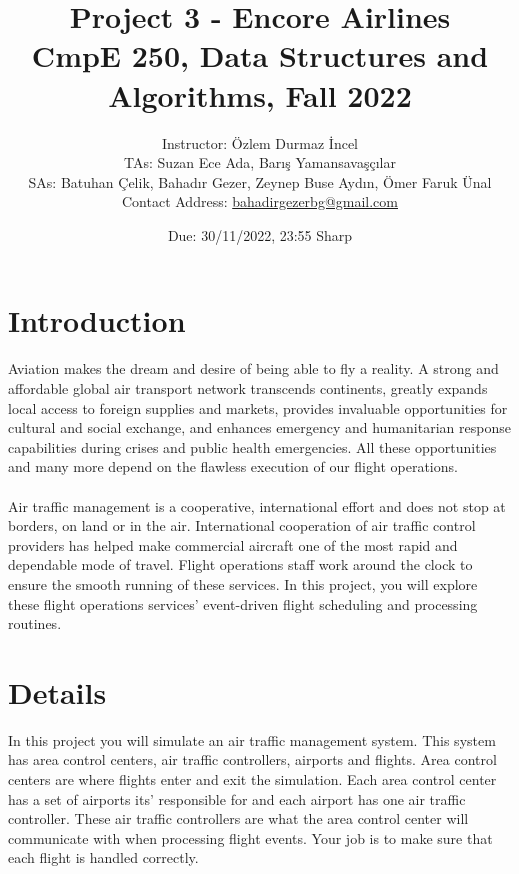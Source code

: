 \documentclass[10pt]{article}
\title{\vspace{-1cm} \Huge Project 3 - Encore Airlines\\ \LARGE CmpE 250, Data Structures and Algorithms, Fall 2022 }
\author{
  Instructor: Özlem Durmaz \.{I}ncel\\
  TAs: Suzan Ece Ada, Bar{\i}\c{s} Yamansavaşç{\i}lar\\
  SAs:  Batuhan \c{C}elik, Bahad{\i}r Gezer, Zeynep Buse Ayd{\i}n, Ömer Faruk Ünal \\
  Contact Address: \href{mailto:bahadirgezerbg@gmail.com}{bahadirgezerbg@gmail.com} 
}
\date{Due: 30/11/2022, 23:55 Sharp}
\begin{document}
  \maketitle
  \vspace{0.05cm}
  
\section{Introduction}

\indent \indent Aviation makes the dream and desire of being able to fly a reality. A strong and affordable global air transport network transcends continents, greatly expands local access to foreign supplies and markets, provides invaluable opportunities for cultural and social exchange, and enhances emergency and humanitarian response capabilities during crises and public health emergencies. All these opportunities and many more depend on the flawless execution of our flight operations. 
\\\\
\indent Air traffic management is a cooperative, international effort and does not stop at borders, on land or in the air. International cooperation of air traffic control providers has helped make commercial aircraft one of the most rapid and dependable mode of travel. Flight operations staff work around the clock to ensure the smooth running of these services. In this project, you will explore these flight operations services' event-driven flight scheduling and processing routines.


\section{Details}

\indent \indent In this project you will simulate an air traffic management system. This system has area control centers, air traffic controllers, airports and flights. Area control centers are where flights enter and exit the simulation. Each area control center has a set of airports its' responsible for and each airport has one air traffic controller. These air traffic controllers are what the area control center will communicate with when processing flight events. Your job is to make sure that each flight is handled correctly. 
\end{document}
